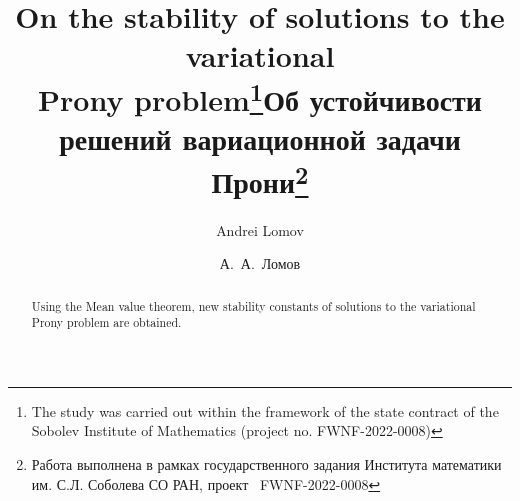 \begin{englishtitle} %
\title{On the stability of solutions to the variational \\ Prony problem\thanks{The study was carried out within the framework of the state contract of the Sobolev Institute of Mathematics (project no. FWNF-2022-0008)}}
\author{Andrei Lomov
}

\maketitle

\vspace{-1ex}
\begin{abstract}
Using the Mean value theorem, new
stability constants of solutions to the variational Prony problem are obtained.

\end{abstract}
\end{englishtitle}

\iffalse
%
%


\documentclass[12pt]{llncs}  


\usepackage{iftex}

\ifPDFTeX
\usepackage[T2A]{fontenc}
\usepackage[utf8]{inputenc} %
\usepackage[english,russian]{babel}
\fi

\usepackage{todonotes} 

\usepackage[russian]{nla}


\fi
\title{Об устойчивости решений вариационной задачи Прони\thanks{Работа выполнена в рамках государственного задания Института математики им. С.Л. Соболева СО РАН, проект \textnumero~FWNF-2022-0008}}
\author{А.~А.~Ломов
}

